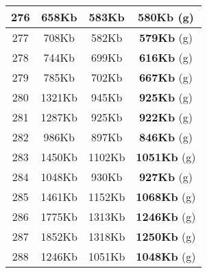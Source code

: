 \begin{table}[H]
\begin{minipage}{5cm}
{\begin{tabular}{|c|c|c|c|}
\hline
276 & 658Kb & 583Kb & \textbf{580Kb} (g) \\
\hline
277 & 708Kb & 582Kb & \textbf{579Kb} (g) \\
\hline
278 & 744Kb & 699Kb & \textbf{616Kb} (g) \\
\hline
279 & 785Kb & 702Kb & \textbf{667Kb} (g) \\
\hline
280 & 1321Kb & 945Kb & \textbf{925Kb} (g) \\
\hline
281 & 1287Kb & 925Kb & \textbf{922Kb} (g) \\
\hline
282 & 986Kb & 897Kb & \textbf{846Kb} (g) \\
\hline
283 & 1450Kb & 1102Kb & \textbf{1051Kb} (g) \\
\hline
284 & 1048Kb & 930Kb & \textbf{927Kb} (g) \\
\hline
285 & 1461Kb & 1152Kb & \textbf{1068Kb} (g) \\
\hline
286 & 1775Kb & 1313Kb & \textbf{1246Kb} (g) \\
\hline
287 & 1852Kb & 1318Kb & \textbf{1250Kb} (g) \\
\hline
288 & 1246Kb & 1051Kb & \textbf{1048Kb} (g) \\
\hline
\end{tabular}
}
\end{minipage}
\begin{minipage}{5cm} 
\end{minipage}
\end{table}
